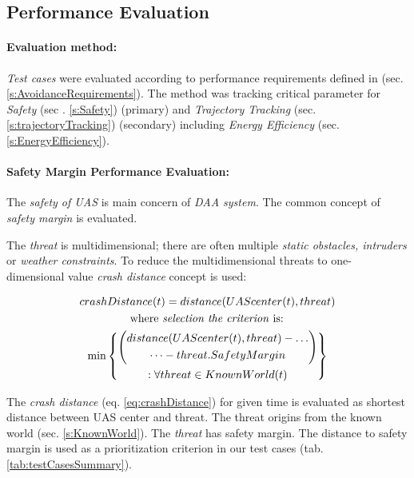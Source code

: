 \subsection{Performance Evaluation}\label{s:performanceEvaluation}
\paragraph{Evaluation method:} \emph{Test cases} were evaluated according to performance requirements defined in (sec. \ref{s:AvoidanceRequirements}). The method was tracking critical parameter for \emph{Safety} (sec . \ref{s:Safety}) (primary) and \emph{Trajectory Tracking} (sec. \ref{s:trajectoryTracking}) (secondary) including \emph{Energy Efficiency} (sec. \ref{s:EnergyEfficiency}).

\paragraph{Safety Margin Performance Evaluation:} The \emph{safety of UAS} is main concern of \emph{DAA system}. The common concept of \emph{safety margin} is evaluated. 

The \emph{threat} is multidimensional; there are often multiple \emph{static obstacles, intruders} or \emph{weather constraints}. To reduce the multidimensional threats to one-dimensional value \emph{crash distance} concept is used:

\begin{multline}\label{eq:crashDistance}
    crashDistance(t) =  distance(UAScenter(t),threat) \\\text{  where \emph{selection the criterion} is:  }\\ \min \left\{\begin{gathered}\left( \begin{gathered} distance(UAScenter(t),threat)-\dots\\\dots-threat.SafetyMargin\end{gathered}\right)\\:\forall threat \in KnownWorld (t)\end{gathered}\right\}
\end{multline}

\noindent The \emph{crash distance} (eq. \ref{eq:crashDistance}) for given time is evaluated as shortest distance between UAS center and threat. The threat origins from the known world (sec. \ref{s:KnownWorld}). The \emph{threat} has safety margin. The distance to safety margin is used as a prioritization criterion in our test cases (tab. \ref{tab:testCasesSummary}).


